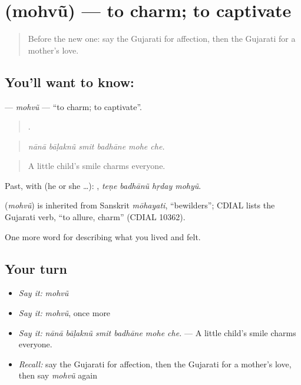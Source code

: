 \section[\texorpdfstring{\gu{મોહવું} (mohvũ)}{મોહવું (mohvũ)}]{ (mohvũ) — to charm; to captivate}

\label{lesson:GU-C450-mohvu}



\begin{quote}
Before the new one: say the Gujarati for affection, then the Gujarati for a mother's love.
\end{quote}

\subsection*{You'll want to know: }
\textbf{} — \emph{mohvũ} — \textquotedblleft{}to charm; to captivate\textquotedblright{}.

\begin{quote}
     .
\end{quote}

\begin{quote}
\emph{nānā bāḷaknũ smit badhāne mohe che.}
\end{quote}

\begin{quote}
A little child's smile charms everyone.
\end{quote}

Past, with  (he or she …):    , \emph{teṇe badhānũ hṛday mohyũ}.

\begin{cousinweb}
\textbf{} (\emph{mohvũ}) is inherited from Sanskrit \emph{mōhayati}, \textquotedblleft{}bewilders\textquotedblright{}; CDIAL lists the Gujarati verb, \textquotedblleft{}to allure, charm\textquotedblright{} (CDIAL 10362).
\end{cousinweb}

\begin{grammarlens}[title={What you've built}]
One more word for describing what you lived and felt.
\end{grammarlens}

\subsection*{Your turn}
\begin{itemize}
\raggedright
  \item \emph{Say it:} \emph{mohvũ}
  \item \emph{Say it:} \emph{mohvũ}, once more
  \item \emph{Say it:} \emph{nānā bāḷaknũ smit badhāne mohe che.} — A little child's smile charms everyone.
  \item \emph{Recall:} say the Gujarati for affection, then the Gujarati for a mother's love, then say \emph{mohvũ} again
\end{itemize}

